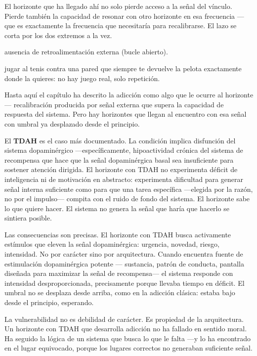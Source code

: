 El horizonte que ha llegado ahí no solo pierde acceso a la señal del vínculo. Pierde también la capacidad de resonar con otro horizonte en esa frecuencia —que es exactamente la frecuencia que necesitaría para recalibrarse. El lazo se corta por los dos extremos a la vez.

\begin{fisica}
 ausencia de retroalimentación externa (bucle abierto).

 jugar al tenis contra una pared que siempre te devuelve la pelota exactamente donde la quieres: no hay juego real, solo repetición.
\end{fisica}
\noindent Hasta aquí el capítulo ha descrito la adicción como algo que le ocurre al horizonte — recalibración producida por señal externa que supera la capacidad de respuesta del sistema. Pero hay horizontes que llegan al encuentro con esa señal con umbral ya desplazado desde el principio.

El \textbf{TDAH} es el caso más documentado. La condición implica disfunción del sistema dopaminérgico —específicamente, hipoactividad crónica del sistema de recompensa que hace que la señal dopaminérgica basal sea insuficiente para sostener atención dirigida. El horizonte con TDAH no experimenta déficit de inteligencia ni de motivación en abstracto: experimenta dificultad para generar señal interna suficiente como para que una tarea específica —elegida por la razón, no por el impulso— compita con el ruido de fondo del sistema. El horizonte sabe lo que quiere hacer. El sistema no genera la señal que haría que hacerlo se sintiera posible.

Las consecuencias son precisas. El horizonte con TDAH busca activamente estímulos que eleven la señal dopaminérgica: urgencia, novedad, riesgo, intensidad. No por carácter sino por arquitectura. Cuando encuentra fuente de estimulación dopaminérgica potente — sustancia, patrón de conducta, pantalla diseñada para maximizar la señal de recompensa— el sistema responde con intensidad desproporcionada, precisamente porque llevaba tiempo en déficit. El umbral no se desplaza desde arriba, como en la adicción clásica: estaba bajo desde el principio, esperando.

La vulnerabilidad no es debilidad de carácter. Es propiedad de la arquitectura. Un horizonte con TDAH que desarrolla adicción no ha fallado en sentido moral. Ha seguido la lógica de un sistema que busca lo que le falta —y lo ha encontrado en el lugar equivocado, porque los lugares correctos no generaban suficiente señal.

